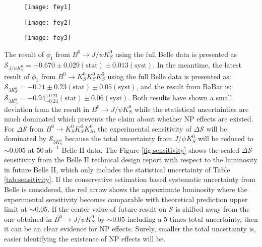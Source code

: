 \begin{figure}[htpb]
 	\centering
	\begin{minipage}[t]{0.32\linewidth}
		\texttt{[image: fey1]}
	\end{minipage}
	\begin{minipage}[t]{0.32\linewidth}
		\texttt{[image: fey2]}
	\end{minipage}
\begin{minipage}[t]{0.32\linewidth}
	\texttt{[image: fey3]}
\end{minipage}
	\caption{}
	\label{fig:3ksfey}
\end{figure}

The result of $\phi_1$ from $B^0 \to J/\psi K_S^0$ using the full Belle data is presented as $\mathcal{S}_{J/\psi K^0_S} = + 0.670 \pm 0.029 (\text{stat}) \pm 0.013(\text{syst})$\cite{b2book}. In the meantime, the latest result of  $\phi_1$ from $B^0 \to K_S^0  K_S^0  K_S^0$ using the full Belle data\cite{kang2020measurement} is presented as: $\mathcal{S}_{3K^0_S} = - 0.71 \pm 0.23 (\text{stat}) \pm 0.05(\text{syst})$, and the result from BaBar \cite{Lees:2011nf} is: $\mathcal{S}_{ 3K^0_S} = - 0.94 ^{+0.21}_{-0.24} (\text{stat}) \pm 0.06(\text{syst})$. Both results have shown a small deviation from the result in $B^0 \to J/\psi K_S^0$ while the statistical uncertainties are much dominated which prevents the claim about whether NP effects are existed. For $\Delta \mathcal{S}$ from $B^0 \to K_S^0  K_S^0  K_S^0$, the experimental sensitivity of $\Delta \mathcal{S}$ will be dominated by $\mathcal{S}_{3K^0_S}$ because the total uncertainty from $J/\psi K^0_S$ will be reduced to  $\sim0.005$ at $50 \: \text{ab}^{-1}$ Belle II data\cite{b2book}. The Figure \ref{fig:sensitivity} shows the scaled $\Delta \mathcal{S}$ sensitivity from the Belle II technical design report\cite{Abe:2010gxa} with respect to the luminosity in future Belle II\cite{Abe:2010gxa}, which only includes the statistical uncertainty of Table \ref{tab:sensitivity}. If the conservative estimation based systematic uncertainty from Belle is considered, the red arrow shows the approximate luminosity where the experimental sensitivity becomes comparable with theoretical prediction upper limit at $\sim 0.05$\cite{b2book}. If the center value of future result on $\mathcal{S}$ is shifted away from the one obtained in $B^0 \to J/\psi K^0_S$ by $\sim 0.05$ including a 5 times total uncertainty, then it can be an clear evidence for NP effects. Surely, smaller the total uncertainty is, easier identifying the existence of NP effects will be.

